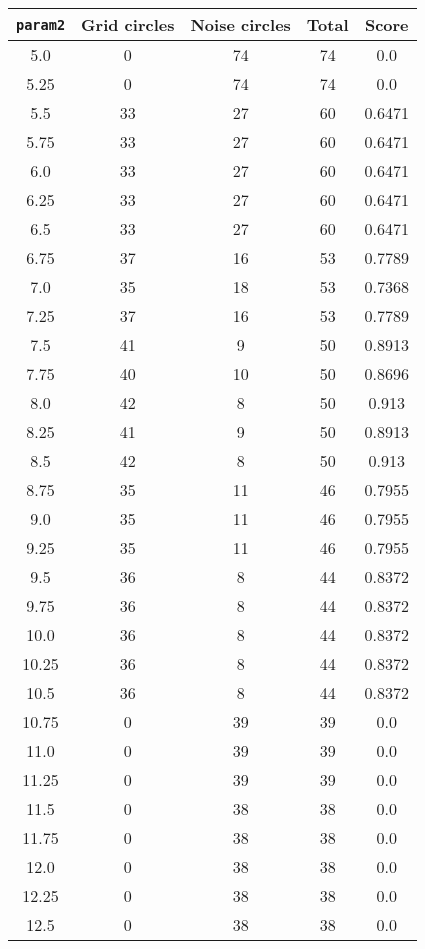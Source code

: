 \documentclass[letterpaper, 12pt]{article}
\begin{document}
\begin{longtable}{|c|c|c|c|c|}
\hline
\textbf{\texttt{param2}} & \textbf{Grid circles} & \textbf{Noise circles} & \textbf{Total} & \textbf{Score} \\
\hline
5.0 & 0 & 74 & 74 & 0.0 \\
\hline
5.25 & 0 & 74 & 74 & 0.0 \\
\hline
5.5 & 33 & 27 & 60 & 0.6471 \\
\hline
5.75 & 33 & 27 & 60 & 0.6471 \\
\hline
6.0 & 33 & 27 & 60 & 0.6471 \\
\hline
6.25 & 33 & 27 & 60 & 0.6471 \\
\hline
6.5 & 33 & 27 & 60 & 0.6471 \\
\hline
6.75 & 37 & 16 & 53 & 0.7789 \\
\hline
7.0 & 35 & 18 & 53 & 0.7368 \\
\hline
7.25 & 37 & 16 & 53 & 0.7789 \\
\hline
7.5 & 41 & 9 & 50 & 0.8913 \\
\hline
7.75 & 40 & 10 & 50 & 0.8696 \\
\hline
8.0 & 42 & 8 & 50 & 0.913 \\
\hline
8.25 & 41 & 9 & 50 & 0.8913 \\
\hline
8.5 & 42 & 8 & 50 & 0.913 \\
\hline
8.75 & 35 & 11 & 46 & 0.7955 \\
\hline
9.0 & 35 & 11 & 46 & 0.7955 \\
\hline
9.25 & 35 & 11 & 46 & 0.7955 \\
\hline
9.5 & 36 & 8 & 44 & 0.8372 \\
\hline
9.75 & 36 & 8 & 44 & 0.8372 \\
\hline
10.0 & 36 & 8 & 44 & 0.8372 \\
\hline
10.25 & 36 & 8 & 44 & 0.8372 \\
\hline
10.5 & 36 & 8 & 44 & 0.8372 \\
\hline
10.75 & 0 & 39 & 39 & 0.0 \\
\hline
11.0 & 0 & 39 & 39 & 0.0 \\
\hline
11.25 & 0 & 39 & 39 & 0.0 \\
\hline
11.5 & 0 & 38 & 38 & 0.0 \\
\hline
11.75 & 0 & 38 & 38 & 0.0 \\
\hline
12.0 & 0 & 38 & 38 & 0.0 \\
\hline
12.25 & 0 & 38 & 38 & 0.0 \\
\hline
12.5 & 0 & 38 & 38 & 0.0 \\

\end{longtable}
\end{document}
